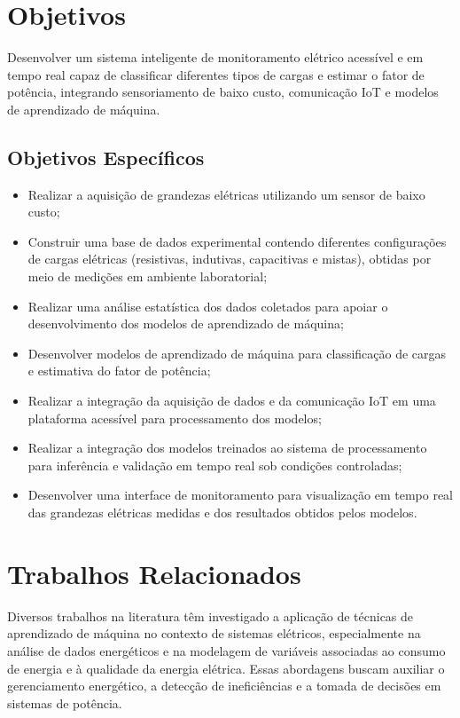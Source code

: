 \section{Objetivos}
Desenvolver um sistema inteligente de monitoramento elétrico acessível e em tempo real capaz de classificar diferentes tipos de cargas e estimar o fator de potência, integrando sensoriamento de baixo custo, comunicação IoT e modelos de aprendizado de máquina.

\subsection{Objetivos Específicos}
\begin{itemize}    
    \item Realizar a aquisição de grandezas elétricas utilizando um sensor de baixo custo;

    \item Construir uma base de dados experimental contendo diferentes configurações de cargas elétricas (resistivas, indutivas, capacitivas e mistas), obtidas por meio de medições em ambiente laboratorial;
    
    \item Realizar uma análise estatística dos dados coletados para apoiar o desenvolvimento dos modelos de aprendizado de máquina;
    
    \item Desenvolver modelos de aprendizado de máquina para classificação de cargas e estimativa do fator de potência;
    
    \item Realizar a integração da aquisição de dados e da comunicação IoT em uma plataforma acessível para processamento dos modelos;
    
    \item Realizar a integração dos modelos treinados ao sistema de processamento para inferência e validação em tempo real sob condições controladas;
    
    \item Desenvolver uma interface de monitoramento para visualização em tempo real das grandezas elétricas medidas e dos resultados obtidos pelos modelos.
\end{itemize}

\section{Trabalhos Relacionados}
Diversos trabalhos na literatura têm investigado a aplicação de técnicas de aprendizado de máquina no contexto de sistemas elétricos, especialmente na análise de dados energéticos e na modelagem de variáveis associadas ao consumo de energia e à qualidade da energia elétrica. Essas abordagens buscam auxiliar o gerenciamento energético, a detecção de ineficiências e a tomada de decisões em sistemas de potência.

